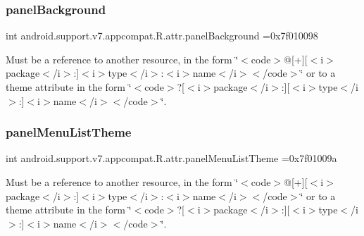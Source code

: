 \subsubsection{\texorpdfstring{panel\+Background}{panelBackground}}
{\footnotesize\ttfamily int android.\+support.\+v7.\+appcompat.\+R.\+attr.\+panel\+Background =0x7f010098\hspace{0.3cm}{\ttfamily [static]}}

Must be a reference to another resource, in the form \char`\"{}$<$code$>$@\mbox{[}+\mbox{]}\mbox{[}$<$i$>$package$<$/i$>$\+:\mbox{]}$<$i$>$type$<$/i$>$\+:$<$i$>$name$<$/i$>$$<$/code$>$\char`\"{} or to a theme attribute in the form \char`\"{}$<$code$>$?\mbox{[}$<$i$>$package$<$/i$>$\+:\mbox{]}\mbox{[}$<$i$>$type$<$/i$>$\+:\mbox{]}$<$i$>$name$<$/i$>$$<$/code$>$\char`\"{}. \mbox{\label{classandroid_1_1support_1_1v7_1_1appcompat_1_1R_1_1attr_a5d9c2e215ca4e27e12fafdb186c0dc53}} 
\subsubsection{\texorpdfstring{panel\+Menu\+List\+Theme}{panelMenuListTheme}}
{\footnotesize\ttfamily int android.\+support.\+v7.\+appcompat.\+R.\+attr.\+panel\+Menu\+List\+Theme =0x7f01009a\hspace{0.3cm}{\ttfamily [static]}}

Must be a reference to another resource, in the form \char`\"{}$<$code$>$@\mbox{[}+\mbox{]}\mbox{[}$<$i$>$package$<$/i$>$\+:\mbox{]}$<$i$>$type$<$/i$>$\+:$<$i$>$name$<$/i$>$$<$/code$>$\char`\"{} or to a theme attribute in the form \char`\"{}$<$code$>$?\mbox{[}$<$i$>$package$<$/i$>$\+:\mbox{]}\mbox{[}$<$i$>$type$<$/i$>$\+:\mbox{]}$<$i$>$name$<$/i$>$$<$/code$>$\char`\"{}. \mbox{\label{classandroid_1_1support_1_1v7_1_1appcompat_1_1R_1_1attr_afe6be40bd1264ce4e4d1ea09fbdd9935}} 
